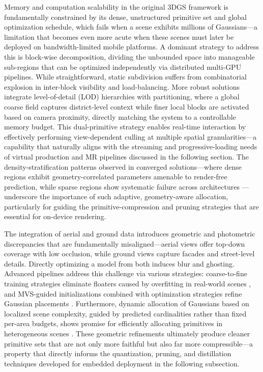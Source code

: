 \documentclass[11pt,a4paper]{article}
\begin{document}
Memory and computation scalability in the original 3DGS framework is fundamentally constrained by its dense, unstructured primitive set and global optimization schedule, which fails when a scene exhibits millions of Gaussians---a limitation that becomes even more acute when these scenes must later be deployed on bandwidth-limited mobile platforms. A dominant strategy to address this is block-wise decomposition, dividing the unbounded space into manageable sub-regions that can be optimized independently via distributed multi-GPU pipelines. While straightforward, static subdivision suffers from combinatorial explosion in inter-block visibility and load-balancing. More robust solutions integrate level-of-detail (LOD) hierarchies with partitioning, where a global coarse field captures district-level context while finer local blocks are activated based on camera proximity, directly matching the system to a controllable memory budget. This dual-primitive strategy enables real-time interaction by effectively performing view-dependent culling at multiple spatial granularities---a capability that naturally aligns with the streaming and progressive-loading needs of virtual production and MR pipelines discussed in the following section. The density-stratification patterns observed in converged solutions---where dense regions exhibit geometry-correlated parameters amenable to render-free prediction, while sparse regions show systematic failure across architectures \cite{arxiv:2602.08909v1}---underscore the importance of such adaptive, geometry-aware allocation, particularly for guiding the primitive-compression and pruning strategies that are essential for on-device rendering.

The integration of aerial and ground data introduces geometric and photometric discrepancies that are fundamentally misaligned---aerial views offer top-down coverage with low occlusion, while ground views capture facades and street-level details. Directly optimizing a model from both induces blur and ghosting. Advanced pipelines address this challenge via various strategies: coarse-to-fine training strategies eliminate floaters caused by overfitting in real-world scenes \cite{arxiv:2402.15870v1}, and MVS-guided initializations combined with optimization strategies refine Gaussian placements \cite{arxiv:2507.00363v1}. Furthermore, dynamic allocation of Gaussians based on localized scene complexity, guided by predicted cardinalities rather than fixed per-area budgets, shows promise for efficiently allocating primitives in heterogeneous scenes \cite{arxiv:2605.07287v2}. These geometric refinements ultimately produce cleaner primitive sets that are not only more faithful but also far more compressible---a property that directly informs the quantization, pruning, and distillation techniques developed for embedded deployment in the following subsection.
\end{document}
